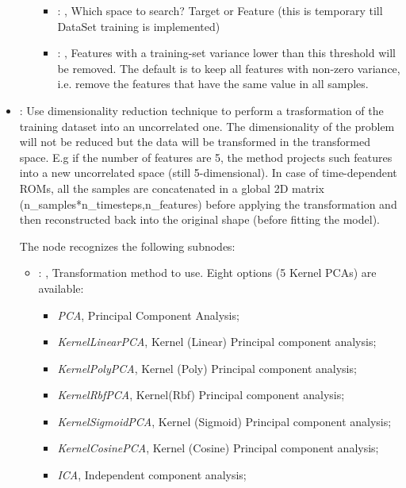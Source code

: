 \begin{itemize}
\begin{itemize}
\begin{itemize}
            \item {}: ,
              Which space to search? Target or Feature (this is temporary till DataSet training is
              implemented)

            \item {}: ,
              Features with a training-set variance lower than this threshold                   will
              be removed. The default is to keep all features with non-zero
              variance, i.e. remove the features that have the same value in all
              samples.
          \end{itemize}
      \end{itemize}

    \item {}:
      Use dimensionality reduction technique to perform a trasformation of the training dataset
      into an uncorrelated one. The dimensionality of the problem will not be reduced but
      the data will be transformed in the transformed space. E.g if the number of features
      are 5, the method projects such features into a new uncorrelated space (still 5-dimensional).
      In case of time-dependent ROMs, all the samples are concatenated in a global 2D matrix
      (n\_samples*n\_timesteps,n\_features) before applying the transformation and then reconstructed
      back into the original shape (before fitting the model).

      The  node recognizes the following subnodes:
      \begin{itemize}
        \item {}: ,
          Transformation method to use. Eight options (5 Kernel PCAs) are available:
          \begin{itemize}                     \item \textit{PCA}, Principal Component Analysis;
          \item \textit{KernelLinearPCA}, Kernel (Linear) Principal component analysis;
          \item \textit{KernelPolyPCA}, Kernel (Poly) Principal component analysis;
          \item \textit{KernelRbfPCA}, Kernel(Rbf) Principal component analysis;
          \item \textit{KernelSigmoidPCA}, Kernel (Sigmoid) Principal component analysis;
          \item \textit{KernelCosinePCA}, Kernel (Cosine) Principal component analysis;
          \item \textit{ICA}, Independent component analysis;                    \end{itemize}


\end{itemize}
\end{itemize}
